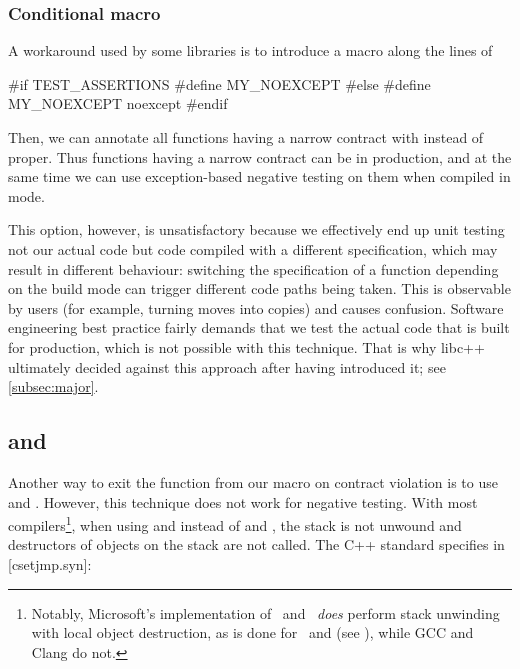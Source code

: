 \subsubsection{Conditional  macro}
\label{subsubsec:conditional}

A workaround used by some libraries is to introduce a macro along the lines of
\begin{codeblock}
#if TEST_ASSERTIONS
  #define MY_NOEXCEPT 
#else
  #define MY_NOEXCEPT noexcept
#endif
\end{codeblock}
Then, we can annotate all functions having a narrow contract with  instead of  proper. Thus functions having a narrow contract can be  in production, and at the same time we can use exception-based negative testing on them when compiled in \mbox{} mode.

This option, however, is unsatisfactory because we effectively end up unit testing not our actual code but code compiled with a different specification, which may result in different behaviour: switching the  specification of a function depending on the build mode can trigger different code paths being taken. This is observable by users (for example, turning moves into copies) and causes confusion. Software engineering best practice fairly demands that we test the actual code that is built for production, which is not possible with this technique. That is why libc++ ultimately decided against this approach after having introduced it; see \ref{subsec:major}.

\subsection{ and }

Another way to exit the function from our  macro on contract violation is to use  and . However, this technique does not work for negative testing. With most compilers\footnote{Notably, Microsoft's implementation of   and  \emph{does} perform stack unwinding with local object destruction, as is done for  and  (see \cite{MSVCDocLongjmp}), while GCC and Clang do not.}, when using  and  instead of  and , the stack is not unwound and destructors of objects on the stack are not called. The C++ standard specifies in [csetjmp.syn]:

